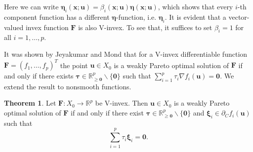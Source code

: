 \documentclass{article}
\theoremstyle{definition}
\newtheorem{theorem}[maar]{Theorem}
\begin{document}
Here we can write $\boldsymbol \eta_i(\boldsymbol x; \boldsymbol u)=\beta_i(\boldsymbol x; \boldsymbol u)\boldsymbol \eta(\boldsymbol x; \boldsymbol u)  $, which shows that every $i$-th component function has a different $\boldsymbol \eta$-function, i.e. $\boldsymbol \eta_i$. It is evident that a vector-valued invex function $\boldsymbol F$ is also V-invex. To see that, it suffices to set $\beta_i = 1$ for all $i=1,\dots,p$.

It was shown by Jeyakumar and Mond \cite{JeyMon} that for a V-invex differentiable function $\boldsymbol F = (f_1,\dots,f_p)^T$ the point $\boldsymbol u \in X_0$ is a weakly Pareto optimal solution of $\boldsymbol F$ if and only if there exists $\boldsymbol \tau \in \mathbb R^p_{\ge \boldsymbol 0}\backslash \{\boldsymbol 0 \}$ such that $\sum_{i=1}^p \tau_i \nabla f_i(\boldsymbol u) = \boldsymbol 0$. 
We extend the result to nonsmooth functions.

\begin{theorem}\label{WP} Let $\boldsymbol F : X_0 \rightarrow \mathbb R^p$ be V-invex. Then $\boldsymbol u \in X_0$ is a weakly Pareto optimal solution of $\boldsymbol F$ if and only if there exist $\boldsymbol \tau \in \mathbb R_{\ge\boldsymbol 0}^p\backslash \{\boldsymbol 0 \}$ and  $\boldsymbol \xi_i \in \partial_C f_i(\boldsymbol u)$ such that
$$\sum_{i=1}^p \tau_i \boldsymbol \xi_i = \boldsymbol 0.$$

\end{theorem}
\end{document}
